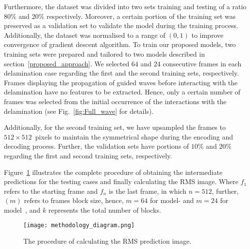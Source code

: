 Furthermore, the dataset was divided into two sets training and testing of a ratio \(80\%\) and \(20\% \) respectively.
Moreover, a certain portion of the training set was preserved as a validation set to validate the model during the training process.
Additionally, the dataset was normalised to a range of \((0, 1)\) to improve convergence of gradient descent algorithm.
To train our proposed models, two training sets were prepared and tailored to two models described in section~\ref{proposed_approach}.
We selected \(64\) and \(24\) consecutive frames in each delamination case regarding the first and the second training sets, respectively.
Frames displaying the propagation of guided waves before interacting with the delamination have no features to be extracted.  
Hence, only a certain number of frames was selected from the initial occurrence of the interactions with the delamination (see Fig.~\ref{fig:Full_wave} for details).

Additionally, for the second training set, we have upsampled the frames to \(512\times512\)~pixels to maintain the symmetrical shape during the encoding and decoding process.
Further, the validation sets have portions of \(10\%\) and \(20\%\) regarding the first and second training sets, respectively.

Figure~\ref{fig:Diagram_exp_predictions} illustrates the complete procedure of obtaining the intermediate predictions for the testing cases and finally calculating the RMS image.
Where \(f_{1}\) refers to the starting frame and \(f_{n}\) is the last frame, in which \(n=512\), further, \((m)\) refers to frames block size, hence, \(m=64\) for model- and \(m=24\) for model~, and \(k\) represents the total number of blocks.
\begin{figure}[!h]
	\centering
	\texttt{[image: methodology\_diagram.png]}
	\caption{The procedure of calculating the RMS prediction image.}
	\label{fig:Diagram_exp_predictions}
\end{figure}
\newpage